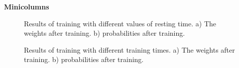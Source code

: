 \documentclass[10pt,a4paper]{article}
\begin{document}
\textbf{Minicolumns}

\begin{figure}[H]
    \centering
    \qquad
    \caption{Results of training with different values of resting time. a) The weights after training. b) probabilities after training.}
    \label{fig:off_line_learning_minicolumns_var}%
\end{figure}

\begin{figure}[H]
    \centering
    \qquad
    \caption{Results of training with different training times. a) The weights after training. b) probabilities after training.}
    \label{fig:off_line_learning_minicolumns_var2}%
\end{figure}
\end{document}
